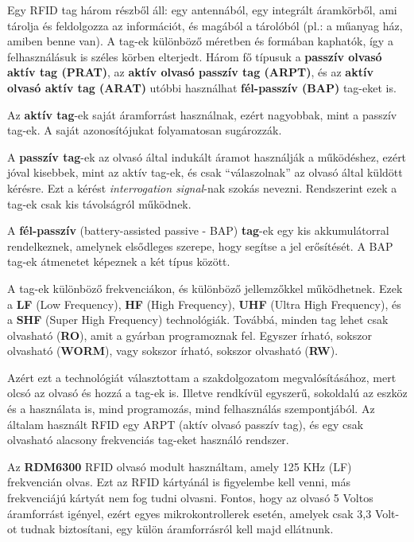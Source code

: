 \documentclass[
]{thesis-ekf}
\theoremstyle{definition}
\theoremstyle{remark}
\begin{document}
Egy RFID tag három részből áll: egy antennából, egy integrált áramkörből, ami tárolja és feldolgozza az információt, és magából a tárolóból (pl.: a műanyag ház, amiben benne van). A tag-ek különböző méretben és formában kaphatók, így a felhasználásuk is széles körben elterjedt. \cite{tagek} Három fő típusuk a \textbf{passzív olvasó aktív tag (PRAT)}, az \textbf{aktív olvasó passzív tag (ARPT)}, és az \textbf{aktív olvasó aktív tag (ARAT)} utóbbi használhat \textbf{fél-passzív (BAP)} tag-eket is. \cite{RFID-types}

Az \textbf{aktív tag}-ek saját áramforrást használnak, ezért nagyobbak, mint a passzív tag-ek. A saját azonosítójukat folyamatosan sugározzák.

A \textbf{passzív tag}-ek az olvasó által indukált áramot használják a működéshez, ezért jóval kisebbek, mint az aktív tag-ek, és csak \enquote{válaszolnak} az olvasó által küldött kérésre. Ezt a kérést \emph{interrogation signal}-nak szokás nevezni. Rendszerint ezek a tag-ek csak kis távolságról működnek.

A \textbf{fél-passzív} (battery-assisted passive - BAP) \textbf{tag}-ek egy kis akkumulátorral rendelkeznek, amelynek elsődleges szerepe, hogy segítse a jel erősítését. A BAP tag-ek átmenetet képeznek a két típus között. 

A tag-ek különböző frekvenciákon, és különböző jellemzőkkel működhetnek. Ezek a \textbf{LF} (Low Frequency), \textbf{HF} (High Frequency), \textbf{UHF} (Ultra High Frequency), és a \textbf{SHF} (Super High Frequency) technológiák. Továbbá, minden tag lehet csak olvasható (\textbf{RO}), amit a gyárban programoznak fel. Egyszer írható, sokszor olvasható (\textbf{WORM}), vagy sokszor írható, sokszor olvasható (\textbf{RW}). \cite{tag-types}

Azért ezt a technológiát választottam a szakdolgozatom megvalósításához, mert olcsó az olvasó és hozzá a tag-ek is. Illetve rendkívül egyszerű, sokoldalú az eszköz és a használata is, mind programozás, mind felhasználás szempontjából. Az általam használt RFID egy ARPT (aktív olvasó passzív tag), és egy csak olvasható alacsony frekvenciás tag-eket használó rendszer.

Az \textbf{RDM6300} RFID olvasó modult használtam, amely 125 KHz (LF) frekvencián olvas. Ezt az RFID kártyánál is figyelembe kell venni, más frekvenciájú kártyát nem fog tudni olvasni. Fontos, hogy az olvasó 5 Voltos áramforrást igényel, ezért egyes mikrokontrollerek esetén, amelyek csak 3,3 Volt-ot tudnak biztosítani, egy külön áramforrásról kell majd ellátnunk.\cite{rdm6300}
\end{document}
